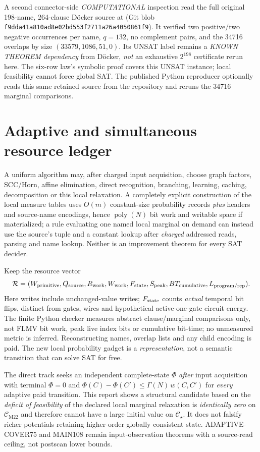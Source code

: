 \documentclass[11pt]{article}
\newcommand{\CM}{\mathcal C_{\mathrm{M22}}}
\newcommand{\CS}{\mathcal C_\star}
\begin{document}
A second connector-side \emph{COMPUTATIONAL} inspection read the full original 198-name, 264-clause D\"ocker source at  (Git blob \texttt{f9dda41a810ad8e02bd553f2711a26a4050861f9}). It verified two positive/two negative occurrences per name, $q=132$, no complement pairs, and the 34716 overlaps by size $(33579,1086,51,0)$. Its UNSAT label remains a \emph{KNOWN THEOREM dependency} from D\"ocker, \emph{not} an exhaustive $2^{198}$ certificate rerun here. The six-row law's symbolic proof covers this UNSAT instance; local feasibility cannot force global SAT. The published Python reproducer optionally reads this same retained source from the repository and reruns the 34716 marginal comparisons.

\section{Adaptive and simultaneous resource ledger}
A uniform algorithm may, after charged input acquisition, choose graph factors, SCC/Horn, affine elimination, direct recognition, branching, learning, caching, decomposition or this local relaxation. A completely explicit construction of the local measure tables uses $O(m)$ constant-size probability records \emph{plus} headers and source-name encodings, hence $\operatorname{poly}(N)$ bit work and writable space if materialized; a rule evaluating one named local marginal on demand can instead use the source's tuple and a constant lookup after \emph{charged} addressed reads, parsing and name lookup. Neither is an improvement theorem for every SAT decider.

Keep the resource vector
\[
 \mathcal R=(W_{\rm primitive},Q_{\rm source},R_{\rm work},W_{\rm work},
 F_{\rm state},S_{\rm peak},BT_{\rm cumulative},L_{\rm program/rep}).
\]
Here writes include unchanged-value writes; $F_{\rm state}$ counts \emph{actual} temporal bit flips, distinct from gates, wires and hypothetical active-one-gate circuit energy. The finite Python checker measures abstract clause/marginal comparisons only, not FLMV bit work, peak live index bits or cumulative bit-time; no unmeasured metric is inferred. Reconstructing names, overlap lists and any child encoding is paid. The new local probability gadget is a \emph{representation}, not a semantic transition that can solve SAT for free.

The direct track seeks an independent complete-state $\Phi$ \emph{after} input acquisition with terminal $\Phi=0$ and $\Phi(C)-\Phi(C')\le\Gamma(N)\,w(C,C')$ for \emph{every} adaptive paid transition. This report shows a structural candidate based on the \emph{deficit of feasibility} of the declared local marginal relaxation is \emph{identically zero} on $\CM$ and therefore cannot have a large initial value on $\CS$. It does not falsify richer potentials retaining higher-order globally consistent state. ADAPTIVE-COVER75 and MAIN108 remain input-observation theorems with a source-read ceiling, not postscan lower bounds.
\end{document}
